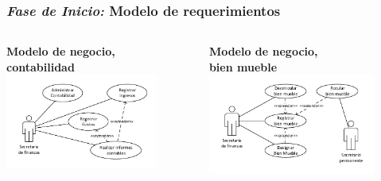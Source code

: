 \documentclass[xcolor=dvipsnames, xcolor=table]{beamer}
\begin{document}
\begin{frame}
    \frametitle{\textit{Fase de Inicio:} Modelo de requerimientos}
    \begin{columns}
      \begin{column}{0.5\textwidth}
        \centering\textbf{\textcolor{color3}{\small Modelo de negocio,\\ contabilidad}\vspace{5mm}}
        \centering\includegraphics[width=5cm]{CUcon}
      \end{column}
      \begin{column}{0.5\textwidth}
        \centering\textbf{\textcolor{color3}{\small Modelo de negocio,\\bien mueble}\vspace{5mm}}
        \includegraphics[width=5.5cm]{CUbm}
      \end{column}
    \end{columns}
\end{frame}
\end{document}
